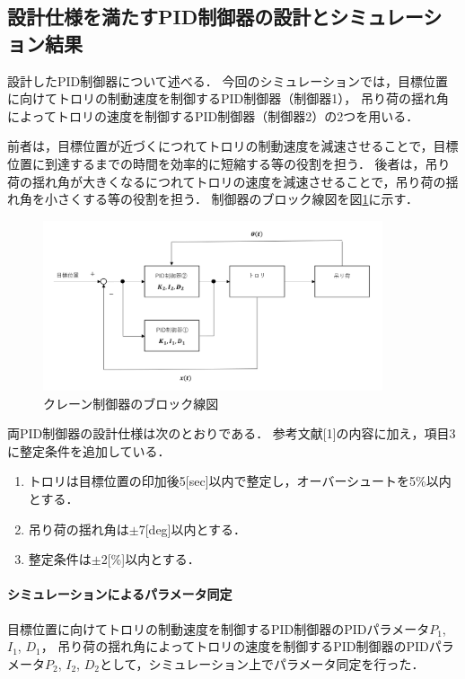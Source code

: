 \documentclass[dvipdfmx,titlepage,a4j]{jsarticle}  %
\begin{document}
\subsection{設計仕様を満たすPID制御器の設計とシミュレーション結果}
設計したPID制御器について述べる．
今回のシミュレーションでは，目標位置に向けてトロリの制動速度を制御するPID制御器（制御器1），
吊り荷の揺れ角によってトロリの速度を制御するPID制御器（制御器2）の2つを用いる．

前者は，目標位置が近づくにつれてトロリの制動速度を減速させることで，目標位置に到達するまでの時間を効率的に短縮する等の役割を担う．
後者は，吊り荷の揺れ角が大きくなるにつれてトロリの速度を減速させることで，吊り荷の揺れ角を小さくする等の役割を担う．
制御器のブロック線図を図\ref{fig:crane:pid}に示す．

\begin{figure}[H]
  \centering
  \includegraphics[width=10cm]{../graph/pid.png}
  \caption{クレーン制御器のブロック線図}
  \label{fig:crane:pid}
\end{figure}

両PID制御器の設計仕様は次のとおりである．
参考文献[1]の内容に加え，項目3に整定条件を追加している．

\begin{enumerate}
  \item トロリは目標位置の印加後5[sec]以内で整定し，オーバーシュートを5\%以内とする．
  \item 吊り荷の揺れ角は$\pm$7[deg]以内とする．
  \item 整定条件は$\pm$2[\%]以内とする．
\end{enumerate}

\paragraph{シミュレーションによるパラメータ同定}

目標位置に向けてトロリの制動速度を制御するPID制御器のPIDパラメータ$P_1$, $I_1$, $D_1$，
吊り荷の揺れ角によってトロリの速度を制御するPID制御器のPIDパラメータ$P_2$, $I_2$, $D_2$として，シミュレーション上でパラメータ同定を行った．
\end{document}
